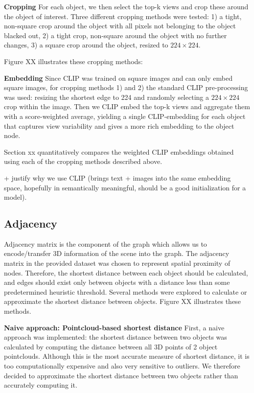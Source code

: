 \bigskip
\noindent
\textbf{Cropping}
For each object, we then select the top-k views and crop these around the object of interest. Three different cropping methods were tested: 1) a tight, non-square crop around the object with all pixels not belonging to the object blacked out, 2) a tight crop, non-square around the object with no further changes, 3) a square crop around the object, resized to $224 \times 224$.

Figure XX illustrates these cropping methods:

\bigskip
\noindent
\textbf{Embedding}
Since CLIP was trained on square images and can only embed square images, for cropping methods 1) and 2) the standard CLIP pre-processing was used: resizing the shortest edge to 224 and randomly selecting a $224 \times 224$ crop within the image. Then we CLIP embed the top-k views and aggregate them with a score-weighted average, yielding a single CLIP-embedding for each object that captures view variability and gives a more rich embedding to the object node.

Section xx quantitatively compares the weighted CLIP embeddings obtained using each of the cropping methods described above.

+ justify why we use CLIP (brings text + images into the same embedding space, hopefully in semantically meaningful, should be a good initialization for a model).

\subsection{Adjacency}
Adjacency matrix is the component of the graph which allows us to encode/transfer 3D information of the scene into the graph. The adjacency matrix in the provided dataset was chosen to represent spatial proximity of nodes. Therefore, the shortest distance between each object should be calculated, and edges should exist only between objects with a distance less than some predetermined heuristic threshold. Several methods were explored to calculate or approximate the shortest distance between objects.
Figure XX illustrates these methods.

\bigskip
\noindent
\textbf{Naive approach: Pointcloud-based shortest distance}
First, a naive approach was implemented: the shortest distance between two objects was calculated by computing the distance between all 3D points of 2 object pointclouds. Although this is the most accurate measure of shortest distance, it is too computationally expensive and also very sensitive to outliers. We therefore decided to approximate the shortest distance between two objects rather than accurately computing it.

